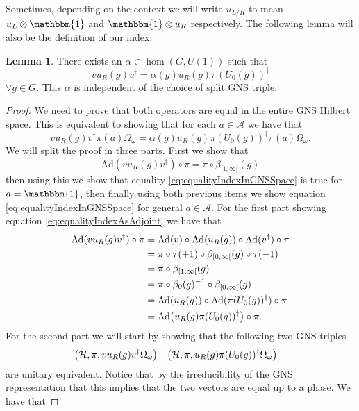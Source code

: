 \documentclass[12pt,a4paper,twoside]{article}
\let\originalleft\left
\let\originalright\right
\renewcommand{\left}{\mathopen{}\mathclose\bgroup\originalleft}
\renewcommand{\right}{\aftergroup\egroup\originalright}
\newcommand{\HH}{\mathcal H}
\renewcommand{\AA}{\mathcal A}
\newcommand{\one}{\mathbbm{1}}
\newcommand{\Ad}{\textrm{Ad}}
\theoremstyle{definition}
\newtheorem{lemma}[theorem]{Lemma}
\numberwithin{equation}{section}
\begin{document}
Sometimes, depending on the context we will write $u_{L/R}$ to mean $u_L\otimes\one$ and $\one\otimes u_R$ respectively. The following lemma will also be the definition of our index:
\begin{lemma}
	There exists an $\alpha\in\hom(G,U(1))$ such that
	\begin{equation}
		v u_R(g)v^\dagger =\alpha(g) u_R(g)\pi(U_0(g))^\dagger
	\end{equation}
	$\forall g\in G$. This $\alpha$ is independent of the choice of split GNS triple.
\end{lemma}
\begin{proof}
	We need to prove that both operators are equal in the entire GNS Hilbert space. This is equivalent to showing that for each $a\in\AA$ we have that
	\begin{equation}\label{eq:equalityIndexInGNSSpace}
		v u_R(g)v^\dagger \pi(a)\Omega_\omega =\alpha(g) u_R(g)\pi(U_0(g))^\dagger\pi(a)\Omega_\omega.
	\end{equation}
	We will split the proof in three parts. First we show that
	\begin{equation}\label{eq:equalityIndexAsAdjoint}
		\Ad(v u_R(g)v^\dagger)\circ\pi=\pi\circ\beta_{[1,\infty[}(g)
	\end{equation}
	then using this we show that equality \eqref{eq:equalityIndexInGNSSpace} is true for $a=\one$, then finally using both previous items we show equation \eqref{eq:equalityIndexInGNSSpace} for general $a\in\AA$. For the first part showing equation \eqref{eq:equalityIndexAsAdjoint} we have that
	\begin{align}
		\Ad(v u_R(g)v^\dagger)\circ\pi&=\Ad(v)\circ\Ad(u_R(g))\circ\Ad(v^\dagger)\circ\pi\\
		&=\pi\circ\tau(+1)\circ\beta_{[0,\infty[}(g)\circ\tau(-1)\\
		&=\pi\circ\beta_{[1,\infty[}(g)\\
		&=\pi\circ\beta_0(g)^{-1}\circ\beta_{[0,\infty[}(g)\\
		&=\Ad(u_R(g))\circ\Ad(\pi(U_0(g))^\dagger)\circ\pi\\
		&=\Ad\left(u_R(g)\pi(U_0(g))^\dagger\right)\circ\pi.
	\end{align}
	For the second part we will start by showing that the following two GNS triples
	\begin{align}\label{eq:TwoGNSTriples}
		\left(\HH,\pi,v u_R(g)v^\dagger \Omega_\omega\right)&&\left(\HH,\pi,u_R(g)\pi(U_0(g))^\dagger \Omega_\omega\right)&
	\end{align}
	are unitary equivalent. Notice that by the irreducibility of the GNS representation that this implies that the two vectors are equal up to a phase. We have that

\end{proof}
\end{document}

